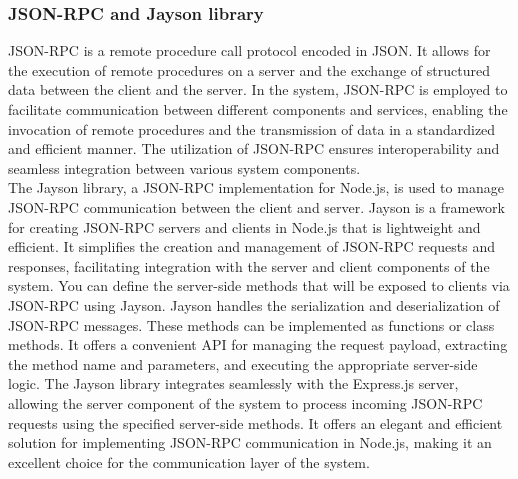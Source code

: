 \documentclass[../Main.tex]{subfiles}
\begin{document}
\subsubsection{JSON-RPC and Jayson library}
JSON-RPC\cite{jsonrpc} is a remote procedure call protocol encoded in JSON. It allows for the execution of remote procedures on a server and the exchange of structured data between the client and the server. In the system, JSON-RPC is employed to facilitate communication between different components and services, enabling the invocation of remote procedures and the transmission of data in a standardized and efficient manner. The utilization of JSON-RPC ensures interoperability and seamless integration between various system components.\\
\indent The Jayson library, a JSON-RPC implementation for Node.js, is used to manage JSON-RPC communication between the client and server. Jayson is a framework for creating JSON-RPC servers and clients in Node.js that is lightweight and efficient. It simplifies the creation and management of JSON-RPC requests and responses, facilitating integration with the server and client components of the system. You can define the server-side methods that will be exposed to clients via JSON-RPC using Jayson. Jayson handles the serialization and deserialization of JSON-RPC messages. These methods can be implemented as functions or class methods. It offers a convenient API for managing the request payload, extracting the method name and parameters, and executing the appropriate server-side logic. The Jayson library integrates seamlessly with the Express.js server, allowing the server component of the system to process incoming JSON-RPC requests using the specified server-side methods. It offers an elegant and efficient solution for implementing JSON-RPC communication in Node.js, making it an excellent choice for the communication layer of the system.\\
\end{document}
